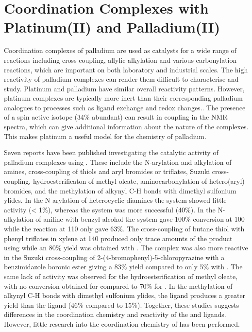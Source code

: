 
\chapter{Coordination Complexes with Platinum(II) and Palladium(II)}
\label{ch:platinumII}

Coordination complexes of palladium are used as catalysts for a wide range of reactions including cross-coupling, allylic alkylation and various carbonylation reactions, which are important on both laboratory and industrial scales.\cite{Dierkes1998, Freixa2003, Nicolaou2005, Peris2004, Shen2008, Suzuki1999, Wu2013, Simeone2010, Trost2012, Wagaw1999}  The high reactivity of palladium complexes can render them difficult to characterise and study.  Platinum and palladium have similar overall reactivity patterns.  However, platinum complexes are typically more inert than their corresponding palladium analogues to processes such as ligand exchange and redox changes.\cite{Chianese2007}.  The presence of a spin active isotope \Pt{} (34\% abundant) can result in coupling in the NMR spectra, which can give additional information about the nature of the complexes.  This makes platinum a useful model for the chemistry of palladium.  

Seven reports have been published investigating the catalytic activity of palladium complexes using \tBuxantphos{}.  These include the N-arylation and alkylation of amines, cross-coupling of thiols and aryl bromides or triflates, Suzuki cross-coupling, hydroesterificaton of methyl oleate, aminocarbonylation of hetero(aryl) bromides, and the methylation of alkynyl C-H bonds with dimethyl sulfonium ylides.\cite{Mispelaere2005, Cabello2007, Ashcroft2013, Behr2013, Friis2014, Dang2013, Liu2013c}  In the N-arylation of heterocyclic diamines the \tBuxantphos{} system showed little activity (\textless{} 1\%), whereas the \Phxantphos{} system was more successful (40\%).\cite{Cabello2007}   In the N-alkylation of aniline with benzyl alcohol the \tBuxantphos{} system gave 100\% conversion at 100\degC{} while the \Phxantphos{} reaction at 110\degC{} only gave 63\%.\cite{Dang2013}  The cross-coupling of butane thiol with phenyl triflates in xylene at 140\degC{} produced only trace amounts of the product using \tBuxantphos{} while an 80\% yield was obtained with \Phxantphos{}.\cite{Mispelaere2005}  The \Phxantphos{} complex was also more reactive in the Suzuki cross-coupling of 2-(4-bromophenyl)-5-chloropyrazine with a benzimidazole boronic ester giving a 83\% yield compared to only 5\% with \tBuxantphos{}.\cite{Ashcroft2013}  The same lack of activity was observed for the hydroesterification of methyl oleate, with no conversion obtained for \tBuxantphos{} compared to 70\% for \Phxantphos{}.  In the methylation of alkynyl C-H bonds with dimethyl sulfonium ylides, the \tBuxantphos{} ligand produces a greater yield than the \Phxantphos{} ligand (46\% compared to 15\%).\cite{Liu2013c}  Together, these studies suggests differences in the coordination chemistry and reactivity of the \tBuxantphos{} and \Phxantphos{} ligands.  However, little research into the coordination chemistry of \tBuxantphos{} has been performed.  

